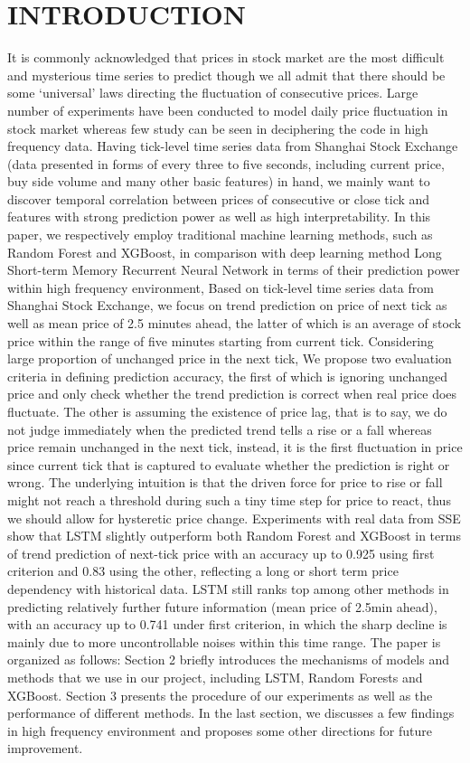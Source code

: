 \documentclass[10pt, conference, compsocconf]{IEEEtran}
\begin{document}
\section{INTRODUCTION}
It is commonly acknowledged that prices in stock market are the most difficult and mysterious time series to predict though we all admit that 
there should be some ‘universal’ laws directing the fluctuation of consecutive prices. 
Large number of experiments have been conducted to model daily price fluctuation in stock market whereas few study can be seen in deciphering 
the code in high frequency data. Having tick-level time series data from Shanghai Stock Exchange (data presented in forms of every three to 
five seconds, including current price, buy side volume and many other basic features) in hand, we mainly want to discover temporal correlation 
between prices of consecutive or close tick and features with strong prediction power as well as high interpretability.
In this paper, we respectively employ traditional machine learning methods, such as Random Forest and XGBoost, in comparison with deep learning 
method Long Short-term Memory Recurrent Neural Network in terms of their prediction power within high frequency environment, Based on tick-level 
time series data from Shanghai Stock Exchange, we focus on trend prediction on price of next tick as well as mean price of 2.5 minutes ahead, 
the latter of which is an average of stock price within the range of five minutes starting from current tick. Considering large proportion of 
unchanged price in the next tick, We propose two evaluation criteria in defining prediction accuracy, the first of which is ignoring unchanged 
price and only check whether the trend prediction is correct when real price does fluctuate. The other is assuming the existence of price lag, 
that is to say, we do not judge immediately when the predicted trend tells a rise or a fall whereas price remain unchanged in the next tick, 
instead, it is the first fluctuation in price since current tick that is captured to evaluate whether the prediction is right or wrong. The 
underlying intuition is that the driven force for price to rise or fall might not reach a threshold during such a tiny time step for price to 
react, thus we should allow for hysteretic price change.
Experiments with real data from SSE show that LSTM slightly outperform both Random Forest and XGBoost in terms of trend prediction of next-tick 
price with an accuracy up to 0.925 using first criterion and 0.83 using the other, reflecting a long or short term price dependency with 
historical data. LSTM still ranks top among other methods in predicting relatively further future information (mean price of 2.5min ahead), 
with an accuracy up to 0.741 under first criterion, in which the sharp decline is mainly due to more uncontrollable noises within this time 
range. The paper is organized as follows: Section 2 briefly introduces the mechanisms of models and methods that we use in our project, 
including LSTM, Random Forests and XGBoost. Section 3 presents the procedure of our experiments as well as the performance of different methods. 
In the last section, we discusses a few findings in high frequency environment and proposes some other directions for future improvement. 
\end{document}
